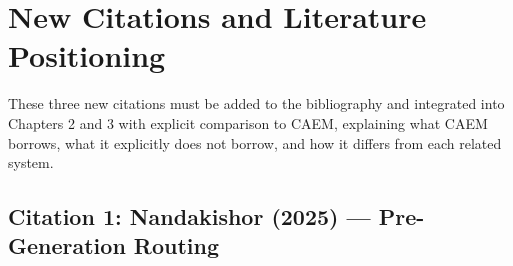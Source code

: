 \documentclass[11pt,a4paper]{article}
\begin{document}
\newpage

\section{New Citations and Literature Positioning}
\label{sec:citations}

These three new citations must be added to the bibliography and integrated into Chapters 2 and 3 with explicit comparison to CAEM, explaining what CAEM borrows, what it explicitly does not borrow, and how it differs from each related system.

\subsection{Citation 1: Nandakishor (2025) — Pre-Generation Routing}
\end{document}

